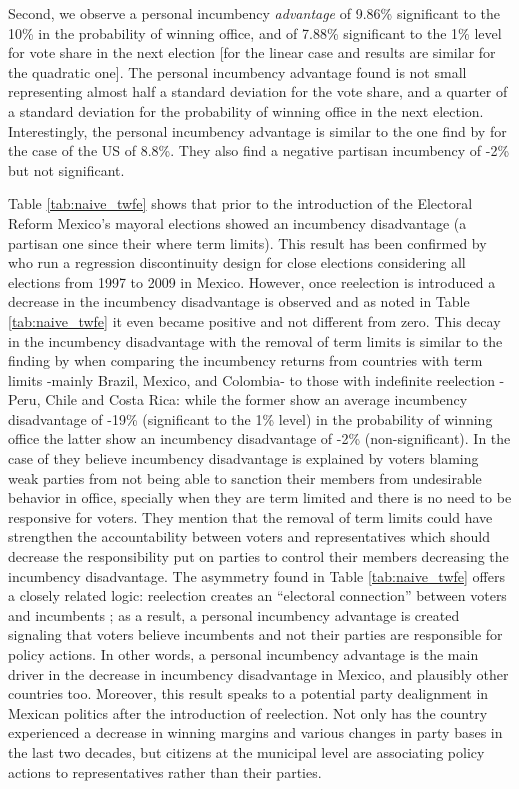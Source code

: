 \documentclass[12pt]{amsart}
\numberwithin{equation}{section}
\theoremstyle{definition}
\theoremstyle{definition}
\theoremstyle{definition}
\begin{document}
Second, we observe a personal incumbency \emph{advantage} of 9.86\% significant to the 10\% in the probability of winning office, and of 7.88\% significant to the 1\% level for vote share in the next election [for the linear case and results are similar for the quadratic one]. The personal incumbency advantage found is not small representing almost half a standard deviation for the vote share, and a quarter of a standard deviation for the probability of winning office in the next election. Interestingly, the personal incumbency advantage is similar to the one find by \citet{fowler_hall_2014} for the case of the US of 8.8\%. They also find a negative partisan incumbency of -2\% but not significant.  

Table \ref{tab:naive_twfe} shows that prior to the introduction of the Electoral Reform Mexico's mayoral elections showed an incumbency disadvantage (a partisan one since their where term limits). This result has been confirmed by \citet{klasnja_titiunik_2017} who run a regression discontinuity design for close elections considering all elections from 1997 to 2009 in Mexico. However, once reelection is introduced a decrease in the incumbency disadvantage is observed and as noted in Table \ref{tab:naive_twfe} it even became positive and not different from zero. This decay in the incumbency disadvantage with the removal of term limits is similar to the finding by \citet{klasnja_titiunik_2017} when comparing the incumbency returns from countries with term limits -mainly Brazil, Mexico, and Colombia-  to those with indefinite reelection -Peru, Chile and Costa Rica: while the former show an average incumbency disadvantage of -19\% (significant to the 1\% level) in the probability of winning office the latter show an incumbency disadvantage of -2\% (non-significant). In the case of \citet{klasnja_titiunik_2017} they believe incumbency disadvantage is explained by voters blaming weak parties from not being able to sanction their members from undesirable behavior in office, specially when they are term limited and there is no need to be responsive for voters. They mention that the removal of term limits could have strengthen the accountability between voters and representatives which should decrease the responsibility put on parties to control their members decreasing the incumbency disadvantage. The asymmetry found in Table \ref{tab:naive_twfe} offers a closely related logic: reelection creates an ``electoral connection'' between voters and incumbents \citep{mayhew_1974}; as a result, a personal incumbency advantage is created signaling that voters believe incumbents and not their parties are responsible for policy actions. In other words, a personal incumbency advantage is the main driver in the decrease in incumbency disadvantage in Mexico, and plausibly other countries too. Moreover, this result speaks to a potential party dealignment in Mexican politics after the introduction of reelection. Not only has the country experienced a decrease in winning margins and various changes in party bases in the last two decades, but citizens at the municipal level are associating policy actions to representatives rather than their parties.   
\end{document}
